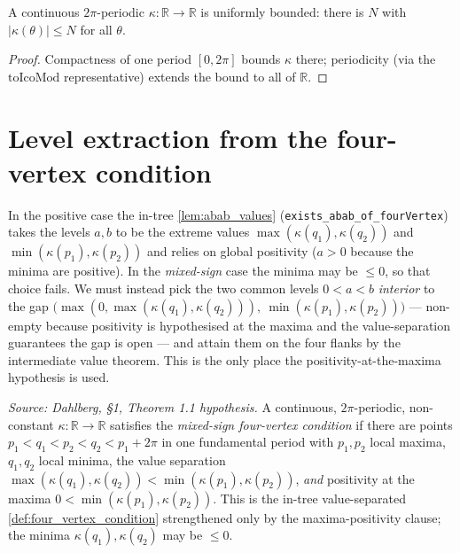 \begin{lemma}


  \label{lem:exists_kappa_bound}
  A continuous $2\pi$-periodic $\kappa:\mathbb{R}\to\mathbb{R}$ is uniformly bounded:
  there is $N$ with $|\kappa(\theta)|\le N$ for all $\theta$.
\end{lemma}
\begin{proof}

\leanok
  Compactness of one period $[0,2\pi]$ bounds $\kappa$ there; periodicity
  (via the $\mathrm{toIcoMod}$ representative) extends the bound to all of $\mathbb{R}$.
\end{proof}

\section{Level extraction from the four-vertex condition}

In the positive case the in-tree \cref{lem:abab_values}
(\texttt{exists\_abab\_of\_fourVertex}) takes the levels $a,b$ to be the extreme
values $\max(\kappa(q_1),\kappa(q_2))$ and $\min(\kappa(p_1),\kappa(p_2))$ and
relies on global positivity ($a>0$ because the minima are positive). In the
\emph{mixed-sign} case the minima may be $\le 0$, so that choice fails. We must
instead pick the two common levels $0<a<b$ \emph{interior} to the gap
$\bigl(\max(0,\max(\kappa(q_1),\kappa(q_2))),\ \min(\kappa(p_1),\kappa(p_2))\bigr)$
--- non-empty because positivity is hypothesised at the maxima and the
value-separation guarantees the gap is open --- and attain them on the four
flanks by the intermediate value theorem. This is the only place the
positivity-at-the-maxima hypothesis is used.

\begin{definition}

  \label{def:mixed_sign_four_vertex}
  \textit{Source: Dahlberg, §1, Theorem 1.1 hypothesis.}
  A continuous, $2\pi$-periodic, non-constant $\kappa:\mathbb{R}\to\mathbb{R}$
  satisfies the \emph{mixed-sign four-vertex condition} if there are points
  $p_1<q_1<p_2<q_2<p_1+2\pi$ in one fundamental period with $p_1,p_2$ local
  maxima, $q_1,q_2$ local minima, the value separation
  $\max(\kappa(q_1),\kappa(q_2))<\min(\kappa(p_1),\kappa(p_2))$, \emph{and}
  positivity at the maxima $0<\min(\kappa(p_1),\kappa(p_2))$. This is the
  in-tree value-separated \cref{def:four_vertex_condition} strengthened only by
  the maxima-positivity clause; the minima $\kappa(q_1),\kappa(q_2)$ may be
  $\le 0$.
\end{definition}

